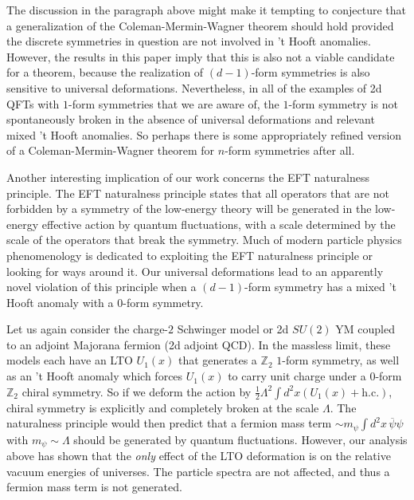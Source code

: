 \documentclass[11pt]{article}
\def\bar{\overline}
\def\coeff#1#2{{\textstyle {\frac {#1}{#2}}}}
\def\half{\coeff 12}
\begin{document}
The discussion in the paragraph above might make it tempting to conjecture that a generalization of the Coleman-Mermin-Wagner theorem should hold provided the discrete symmetries in question are not involved in 't Hooft anomalies.  However, the results in this paper imply  that this is also not a viable candidate for a theorem, because the realization of $(d-1)$-form symmetries is also sensitive to universal deformations.  Nevertheless, in all of the examples of 2d QFTs with $1$-form symmetries that we are aware of, the $1$-form symmetry is not spontaneously broken in the absence of universal deformations and relevant mixed 't Hooft anomalies. So perhaps there is some appropriately refined version of a Coleman-Mermin-Wagner theorem for $n$-form symmetries after all.

Another interesting implication of our work concerns the EFT naturalness principle.  
The EFT naturalness principle states that all operators that are not forbidden by 
a symmetry of the low-energy theory will be generated in the low-energy effective 
action by quantum fluctuations, with a scale determined by the scale of the operators 
that break the symmetry.  Much of modern particle physics phenomenology is dedicated 
to exploiting the EFT naturalness principle or looking for ways around it.  Our universal 
deformations lead to an apparently novel violation of this principle when a $(d-1)$-form 
symmetry has a mixed 't Hooft anomaly with a $0$-form symmetry. 


Let us again consider the charge-$2$ Schwinger model or 2d $SU(2)$ YM coupled to an  adjoint 
Majorana fermion (2d adjoint QCD).  In the massless limit, 
these models each have an LTO $U_{1}(x)$ that generates a $\mathbb{Z}_2$ $1$-form 
symmetry, as well as an  't Hooft anomaly which forces $U_1(x)$ to carry unit charge 
under a $0$-form $\mathbb{Z}_2$ chiral symmetry.  So if we deform the action by 
$\half \Lambda^2 \int d^{2}x   \left( U_{1}(x) + \textrm{h.c.}\right)$, chiral 
symmetry is explicitly and completely broken at the scale $\Lambda$. The naturalness 
principle would then predict that a fermion mass term $\sim m_{\psi}\int d^{2}x\, \bar{\psi}\psi $ 
with $m_{\psi} \sim \Lambda$ should be generated  by quantum fluctuations.  However, our 
analysis above has shown that the \emph{only} effect of the LTO deformation is on
the relative vacuum energies of universes.   The particle spectra are not affected, 
and thus a fermion mass term is not generated.
\end{document}
